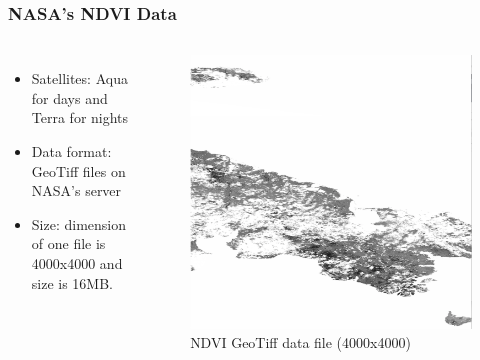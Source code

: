 \begin{frame}
\frametitle{NASA's NDVI Data}
\begin{columns}

\begin{itemize}
    \item Satellites: Aqua for days and Terra for nights
    \item Data format: GeoTiff files on NASA's server
    \item Size: dimension of one file is 4000x4000 and size is 16MB.
\end{itemize}

\begin{figure}
    \centering
    \begin{minipage}{.95\columnwidth}
    \includegraphics[width=\linewidth]{final/figures/geotiff.png}
    \caption{\tiny{NDVI GeoTiff data file (4000x4000)}}
    \end{minipage}
\end{figure}
\end{columns}
\end{frame}

